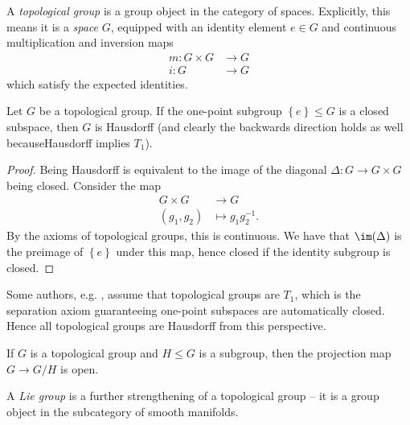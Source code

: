 \documentclass[11pt]{amsart}
\begin{document}
\begin{definition}\label{def:topological-group} 
A \emph{topological group} is a group object in the category of spaces. Explicitly, this means it is a \emph{space} $G$, equipped with an identity element $e\in G$ and continuous multiplication and inversion maps
\begin{align*}
    m \colon G \times G &\to G \\
    i \colon G &\to G
\end{align*}
which satisfy the expected identities. 
\end{definition}

\begin{proposition} Let $G$ be a topological group. If the one-point subgroup $\left\{ e \right\} \le G$ is a closed subspace, then $G$ is Hausdorff (and clearly the backwards direction holds as well becauseHausdorff implies $T_1$).
\end{proposition}
\begin{proof} Being Hausdorff is equivalent to the image of the diagonal $\Delta \colon G \to G \times G$ being closed. Consider the map
\begin{align*}
    G \times G &\to G \\
    (g_1,g_2) &\mapsto g_1 g_2^{-1}.
\end{align*}
By the axioms of topological groups, this is continuous. We have that $\im(\Delta)$ is the preimage of $\left\{ e \right\}$ under this map, hence closed if the identity subgroup is closed.
\end{proof}

\begin{remark} Some authors, e.g. \cite{Munkres}, assume that topological groups are $T_1$, which is the separation axiom guaranteeing one-point subspaces are automatically closed. Hence all topological groups are Hausdorff from this perspective.
\end{remark}

\begin{exercise}
If $G$ is a topological group and $H \le G$ is a subgroup, then the projection map $G \to G/H$ is open.
\end{exercise}





\begin{example} A \emph{Lie group} is a further strengthening of a topological group -- it is a group object in the subcategory of smooth manifolds.
\end{example}
\end{document}
